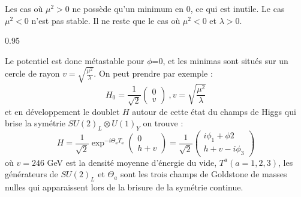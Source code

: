 Les cas où $\mu^{2}>0$ ne possède qu'un minimum en $0$, ce qui est inutile. Le cas $\mu^{2}<0$ n'est pas stable. Il ne reste que le cas où $\mu^{2}<0$ et $\lambda>0$.

\begin{minipagewithmarginpars}[h]{0.95\textwidth}
\centering
{}
\label{pot}
\end{minipagewithmarginpars}

Le potentiel est donc métastable pour $\phi$=0, et les minimas sont situés sur un cercle de rayon $v=\sqrt{\frac{\mu^{2}}{\lambda}}$. On peut prendre par exemple :
\begin{equation}
H_{0}=\frac{1}{\sqrt{2}}\begin{pmatrix} 
0\\
v
\end{pmatrix} \ , v=\sqrt{\frac{\mu^{2}}{\lambda}}
\end{equation}
et en développement le doublet $H$ autour de cette état du champs de Higgs qui brise la symétrie $SU(2)_{L}\otimes U(1)_{Y}$ on trouve : 
\begin{equation}
H=\frac{1}{\sqrt{2}}\exp^{-i\Theta_{a}T_{a}}\begin{pmatrix} 
0\\
h+v
\end{pmatrix}=\frac{1}{\sqrt{2}}\begin{pmatrix} 
i\phi_{1}+\phi{2}\\
h+v-i\phi_{3}
\end{pmatrix}
\end{equation}
où $v=246$ GeV est la densité moyenne d'énergie du vide, $T^{a} (a=1,2,3)$, les générateurs de $SU(2)_{L}$ et $\Theta_{a}$ sont les trois champs de Goldstone de masses nulles qui apparaissent lors de la brisure de la symétrie continue.

